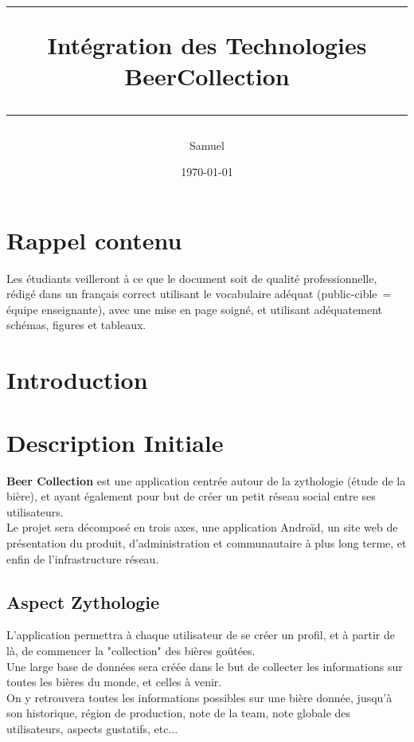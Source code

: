 \documentclass{report}
\title{
\parbox{15cm}
{ \vspace{3cm}
	\begin{center}\sf\bfseries\Huge
		\rule{15cm}{1pt}
		\medskip
		Intégration des Technologies\\
		\huge BeerCollection
		\vspace{.5cm}
		\rule{15cm}{1pt}
	\end{center}
	\vspace{3cm}
 }}
\author{Samuel \bsc{Monroe}}
\date{\today}
\begin{document}
\maketitle

\newpage
\thispagestyle{empty}
\mbox{}

\tableofcontents

\chapter{Rappel contenu}

Les étudiants veilleront à ce que le document soit de qualité professionnelle, rédigé dans un français correct utilisant le vocabulaire adéquat (public-cible = équipe enseignante), avec une mise en page soigné, et utilisant adéquatement schémas, figures et tableaux.  


\chapter{Introduction} %

	
	
\chapter{Description Initiale}

	\textbf{Beer Collection} est une application centrée autour de la zythologie (étude de la bière), et ayant également pour but de créer un petit réseau social entre ses utilisateurs.\\

	Le projet sera décomposé en trois axes, une application Androïd, un site web de présentation du produit, d'administration et communautaire à plus long terme, et enfin de l'infrastructure réseau.\\

	\section{Aspect Zythologie}

		L'application permettra à chaque utilisateur de se créer un profil, et à partir de là, de commencer la "collection" des bières goûtées.\\

		Une large base de données sera créée dans le but de collecter les informations sur toutes les bières du monde, et celles à venir.\\
		On y retrouvera toutes les informations possibles sur une bière donnée, jusqu'à son historique, région de production, note de la team, note globale des utilisateurs, aspects gustatifs, etc...\\
\end{document}
